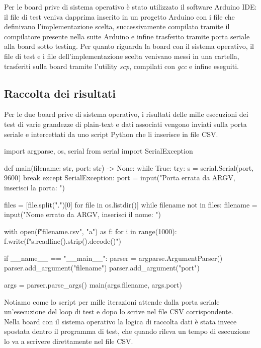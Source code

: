 \documentclass[12pt,a4paper,italian]{report}
\begin{document}
Per le board prive di sistema operativo è stato utilizzato il software Arduino IDE: il file di test veniva dapprima inserito in un progetto Arduino con i file che definivano l'implementazione scelta, successivamente compilato tramite il compilatore presente nella suite Arduino e infine trasferito tramite porta seriale alla board sotto testing. Per quanto riguarda la board con il sistema operativo, il file di test e i file dell'implementazione scelta venivano messi in una cartella, trasferiti sulla board tramite l'utility \textit{scp}, compilati con \textit{gcc} e infine eseguiti.

\subsection{Raccolta dei risultati}

Per le due board prive di sistema operativo, i risultati delle mille esecuzioni dei test di varie grandezze di plain-text e dati associati vengono inviati sulla porta seriale e intercettati da uno script Python che li inserisce in file CSV.

\begin{python}
import argparse, os, serial
from serial import SerialException


def main(filename: str, port: str) -> None:
  while True:
    try:
      s = serial.Serial(port, 9600)
        break
      except SerialException:
        port = input("Porta errata da ARGV, inserisci la porta: ")

  files = [file.split(".")[0] for file in os.listdir()]
  while filename not in files:
    filename = input("Nome errato da ARGV, inserisci il nome: ")

  with open(f"{filename}.csv", "a") as f:
    for i in range(1000):
      f.write(f"{s.readline().strip().decode()}\n")


if __name__ == "__main__":
  parser = argparse.ArgumentParser()
  parser.add_argument("filename")
  parser.add_argument("port")

  args = parser.parse_args()
  main(args.filename, args.port)
\end{python}

\noindent Notiamo come lo script per mille iterazioni attende dalla porta seriale un'esecuzione del loop di test e dopo lo scrive nel file CSV corrispondente. \\

\noindent Nella board con il sistema operativo la logica di raccolta dati è stata invece spostata dentro il programma di test, che quando rileva un tempo di esecuzione lo va a scrivere direttamente nel file CSV.
\end{document}
